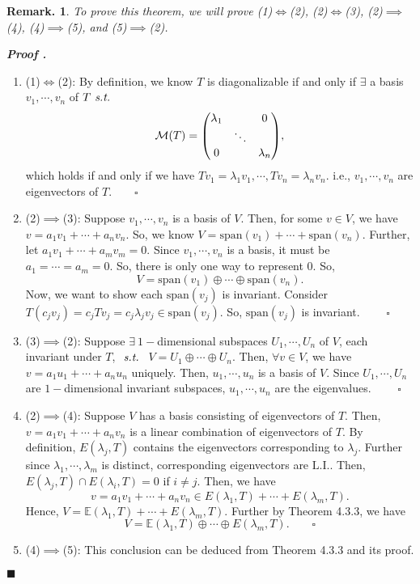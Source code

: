 \documentclass[11pt, letterpaper]{article}
\newcounter{nprf}[subsection]
\newenvironment*{prf}{\par\indent\textbf{\textit{Proof \stepcounter{nprf}\thenprf.}}}{\hfill$\blacksquare$\par}
\newtheorem*{rmk}{Remark.}
\def\E{\mathbb{E}}
\def\M{\mathcal{M}}
\def\st{\emph{ s.t. }}
\def\LI{\mathrm{L.I.}}
\def\span{\mathrm{span}}
\def\pqde{\qquad\square}
\begin{document}
\begin{rmk}
	To prove this theorem, we will prove (1)$\iff$(2), (2)$\iff$(3), (2)$\implies$(4), (4)$\implies$(5), and (5)$\implies$(2).	
\end{rmk}
\begin{prf}
	\begin{enumerate}
		\item (1)$\iff$(2): By definition, we know $T$ is diagonalizable if and only if $\exists$ a basis $v_1,\cdots,v_n$ of $T\st$ \[\M(T)=\mqty(\lambda_1&&0\\&\ddots&\\0&&\lambda_n),\] which holds if and only if we have $Tv_1=\lambda_1v_1,\cdots,Tv_n=\lambda_nv_n$. i.e., $v_1,\cdots,v_n$ are eigenvectors of $T.\pqde$
		\item (2)$\implies$(3): Suppose $v_1,\cdots,v_n$ is a basis of $V$. Then, for some $v\in V$, we have $v=a_1v_1+\cdots+a_nv_n$. So, we know $V=\span(v_1)+\cdots+\span(v_n)$. Further, let $a_1v_1+\cdots+a_mv_m=0$. Since $v_1,\cdots,v_n$ is a basis, it must be $a_1=\cdots=a_m=0$. So, there is only one way to represent $0$. So, \[V=\span(v_1)\oplus\cdots\oplus\span(v_n).\] Now, we want to show each $\span(v_j)$ is invariant. Consider $T(c_jv_j)=c_jTv_j=c_j\lambda_jv_j\in\span(v_j)$. So, $\span(v_j)$ is invariant. $\pqde$
		\item (3)$\implies$(2): Suppose $\exists\ 1-$dimensional subspaces $U_1,\cdots,U_n$ of $V$, each invariant under $T$, $\st$ $V=U_1\oplus\cdots\oplus U_n$. Then, $\forall v\in V$, we have $v=a_1u_1+\cdots+a_nu_n$ uniquely. Then, $u_1,\cdots,u_n$ is a basis of $V$. Since $U_1,\cdots,U_n$ are $1-$dimensional invariant subspaces, $u_1,\cdots,u_n$ are the eigenvalues. $\pqde$
		\item (2)$\implies$(4): Suppose $V$ has a basis consisting of eigenvectors of $T$. Then, $v=a_1v_1+\cdots+a_nv_n$ is a linear combination of eigenvectors of $T$. By definition, $E(\lambda_j,T)$ contains the eigenvectors corresponding to $\lambda_j$. Further since $\lambda_1,\cdots,\lambda_m$ is distinct, corresponding eigenvectors are $\LI$. Then, $E(\lambda_j,T)\cap E(\lambda_i,T)=\qty{0}$ if $i\neq j$. Then, we have \[v=a_1v_1+\cdots+a_nv_n\in E(\lambda_1, T)+\cdots+E(\lambda_m,T).\] Hence, $V=\E(\lambda_1,T)+\cdots+E(\lambda_m, T)$. Further by Theorem 4.3.3, we have \[V=\E(\lambda_1,T)\oplus\cdots\oplus E(\lambda_m, T).\pqde\]
		\item (4)$\implies$(5): This conclusion can be deduced from Theorem 4.3.3 and its proof.

\end{enumerate}
\end{prf}
\end{document}
